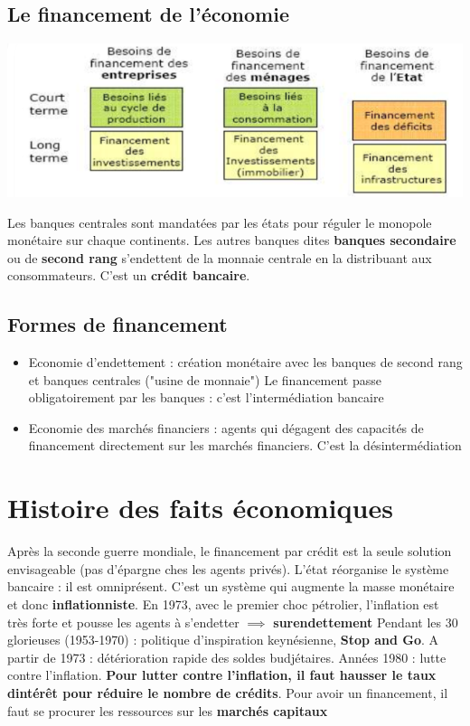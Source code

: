 \subsection{Le financement de l'économie}
\begin{center}
    \includegraphics[scale=0.8]{Pics/Financement_economie.png}
\end{center}
Les banques centrales sont mandatées par les états pour réguler le monopole monétaire sur chaque continents. Les autres banques dites \textbf{banques secondaire} ou de \textbf{second rang} s'endettent de la monnaie centrale en la distribuant aux consommateurs. C'est un \textbf{crédit bancaire}.
\subsection{Formes de financement}
\begin{itemize}
    \item \textcolor{BrickRed}{Economie d'endettement} : création monétaire avec les banques de second rang et banques centrales ("usine de monnaie") \newline
    Le financement passe obligatoirement par les banques : c'est \textcolor{BrickRed}{l'intermédiation bancaire}
    \item \textcolor{BrickRed}{Economie des marchés financiers} : agents qui dégagent des capacités de financement directement sur les marchés financiers.\newline
    C'est \textcolor{BrickRed}{la désintermédiation}
\end{itemize}
\newpage
\section{Histoire des faits économiques}
Après la seconde guerre mondiale, le financement par crédit est la seule solution envisageable (pas d'épargne ches les agents privés). L'état réorganise le système bancaire : il est omniprésent. \newline
C'est un système qui augmente la masse monétaire et donc \textbf{inflationniste}. En 1973, avec le premier choc pétrolier, l'inflation est très forte et pousse les agents à s'endetter $\implies$ \textbf{surendettement}
\newline
Pendant les 30 glorieuses (1953-1970) : politique d'inspiration keynésienne, \textbf{Stop and Go}. \newline
A partir de 1973 : détérioration rapide des soldes budjétaires. \newline
Années 1980 : lutte contre l'inflation. \newline
\textbf{Pour lutter contre l'inflation, il faut hausser le taux dintérêt pour réduire le nombre de crédits}. Pour avoir un financement, il faut se procurer les ressources sur les \textbf{marchés capitaux}
\newpage
